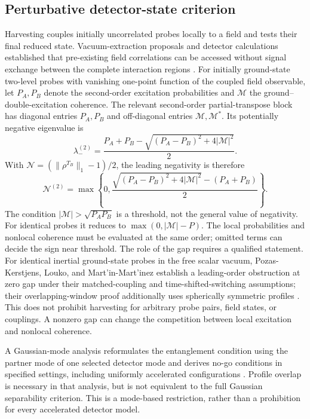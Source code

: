 \documentclass[pdflatex,sn-mathphys-num]{sn-jnl}
\begin{document}
\subsection{Perturbative detector-state criterion}
Harvesting couples initially uncorrelated probes locally to a field and tests their final reduced state. Vacuum-extraction proposals and detector calculations established that pre-existing field correlations can be accessed without signal exchange between the complete interaction regions \cite{Reznik2003,ReznikRetzkerSilman2005,PozasKerstjens2015}. For initially ground-state two-level probes with vanishing one-point function of the coupled field observable, let $P_A,P_B$ denote the second-order excitation probabilities and $\mathcal M$ the ground--double-excitation coherence. The relevant second-order partial-transpose block has diagonal entries $P_A,P_B$ and off-diagonal entries $\mathcal M,\mathcal M^*$. Its potentially negative eigenvalue is
\begin{equation}
\lambda_-^{(2)}=\frac{P_A+P_B-\sqrt{(P_A-P_B)^2+4|\mathcal M|^2}}{2}.
\end{equation}
With $\mathcal N=(\|\rho^{T_B}\|_1-1)/2$, the leading negativity is therefore
\begin{equation}
\mathcal N^{(2)}=\max\!\left\{0,
\frac{\sqrt{(P_A-P_B)^2+4|\mathcal M|^2}-(P_A+P_B)}{2}\right\}.
\label{eq:negativity}
\end{equation}
The condition $|\mathcal M|>\sqrt{P_AP_B}$ is a threshold, not the general value of negativity. For identical probes it reduces to $\max(0,|\mathcal M|-P)$. The local probabilities and nonlocal coherence must be evaluated at the same order; omitted terms can decide the sign near threshold. The role of the gap requires a qualified statement. For identical inertial ground-state probes in the free scalar vacuum, Pozas-Kerstjens, Louko, and Mart'{i}n-Mart'{i}nez establish a leading-order obstruction at zero gap under their matched-coupling and time-shifted-switching assumptions; their overlapping-window proof additionally uses spherically symmetric profiles \cite{PozasKerstjensLoukoMartinez2017}. This does not prohibit harvesting for arbitrary probe pairs, field states, or couplings. A nonzero gap can change the competition between local excitation and nonlocal coherence.

A Gaussian-mode analysis reformulates the entanglement condition using the partner mode of one selected detector mode and derives no-go conditions in specified settings, including uniformly accelerated configurations \cite{OsawaNambuYoshimoto2026}. Profile overlap is necessary in that analysis, but is not equivalent to the full Gaussian separability criterion. This is a mode-based restriction, rather than a prohibition for every accelerated detector model.
\end{document}
